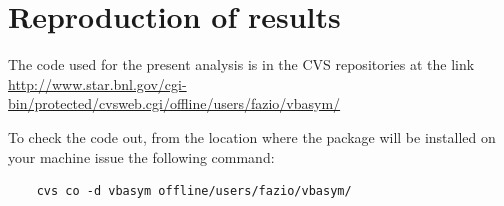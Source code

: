 \documentclass[12pt]{article}
\begin{document}
%


%







\appendix
\section{Reproduction of results}
The code used for the present analysis is in the CVS repositories at the link
\newline \url{http://www.star.bnl.gov/cgi-bin/protected/cvsweb.cgi/offline/users/fazio/vbasym/}

To check the code out, from the location where the package will be
installed on your machine issue the following command:

\begin{lstlisting}
    cvs co -d vbasym offline/users/fazio/vbasym/
\end{lstlisting}

\end{document}
